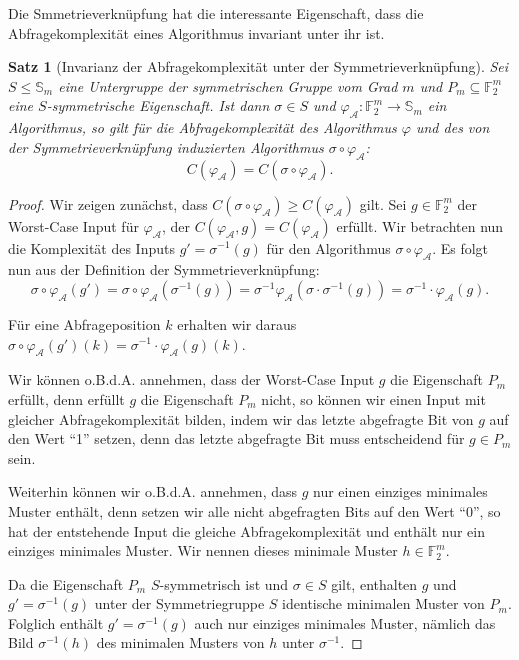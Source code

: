 \documentclass[10pt,a4paper, footheight=1mm]{scrreprt}
\newtheorem{Satz}[definition]{Satz}
\theoremstyle{definition}
\begin{document}
Die Smmetrieverknüpfung hat die interessante Eigenschaft,
dass die Abfragekomplexität eines Algorithmus invariant unter
ihr ist.

\begin{Satz}[Invarianz der Abfragekomplexität unter der Symmetrieverknüpfung]
Sei $S\leq \mathbb{S}_m$ eine Untergruppe der symmetrischen Gruppe vom
Grad $m$ und $P_m \subseteq\mathbb{F}_2^m$ eine $S$-symmetrische
Eigenschaft. Ist dann $\sigma \in S$ und
$\varphi_\mathcal{A}:\mathbb{F}_2^m \to \mathbb{S}_m$ ein Algorithmus,
so gilt für die Abfragekomplexität des Algorithmus $\varphi$
und des von der Symmetrieverknüpfung induzierten Algorithmus
$\sigma \circ \varphi_\mathcal{A}$:
$$C(\varphi_\mathcal{A}) = C(\sigma \circ \varphi_\mathcal{A}).$$
\end{Satz}
\begin{proof}
Wir zeigen zunächst, dass 
$C(\sigma \circ \varphi_\mathcal{A}) \geq C(\varphi_\mathcal{A})$ gilt. 
Sei $g\in\mathbb{F}_2^m$ der Worst-Case Input für $\varphi_\mathcal{A}$,
der $C(\varphi_\mathcal{A}, g) = C(\varphi_\mathcal{A})$ erfüllt.
Wir betrachten nun die Komplexität des Inputs $g' = \sigma^{-1}(g)$
für den Algorithmus $\sigma \circ \varphi_\mathcal{A}$.
Es folgt nun aus der Definition der Symmetrieverknüpfung:
\begin{equation}
\label{eq:Symmetrie}
\sigma \circ \varphi_\mathcal{A} (g')
= \sigma \circ \varphi_\mathcal{A} (\sigma^{-1}(g)) 
= \sigma^{-1} \varphi_\mathcal{A}(\sigma \cdot \sigma^{-1} (g))
= \sigma^{-1} \cdot \varphi_\mathcal{A}(g).
\end{equation}

Für eine Abfrageposition $k$ erhalten wir daraus 
$\sigma \circ \varphi_\mathcal{A}(g')(k) 
= \sigma^{-1} \cdot \varphi_\mathcal{A}(g)(k)$.

Wir können o.B.d.A. annehmen, dass der Worst-Case Input $g$ die
Eigenschaft $P_m$ erfüllt, denn erfüllt $g$ die Eigenschaft
$P_m$ nicht, so können wir einen Input  mit gleicher
Abfragekomplexität bilden, indem wir das letzte abgefragte
Bit von $g$ auf den Wert "`1"' setzen, denn das letzte
abgefragte Bit muss entscheidend für $g\in P_m$ sein.

Weiterhin können wir o.B.d.A. annehmen, dass $g$ nur 
einen einziges minimales Muster enthält, denn setzen wir
alle nicht abgefragten Bits auf den Wert "`0"', so hat
der entstehende Input die gleiche Abfragekomplexität
und enthält nur ein einziges minimales Muster.
Wir nennen dieses minimale Muster $h\in \mathbb{F}_2^m$.

Da die Eigenschaft $P_m$ $S$-symmetrisch ist und 
$\sigma\in S$ gilt, enthalten $g$ und $g'=\sigma^{-1}(g)$
unter der Symmetriegruppe $S$ identische minimalen Muster von $P_m$.
Folglich enthält $g'=\sigma^{-1}(g)$ auch nur einziges minimales Muster,
nämlich das Bild $\sigma^{-1}(h)$ des minimalen Musters von $h$ unter
$\sigma^{-1}$.


\end{proof}
\end{document}
